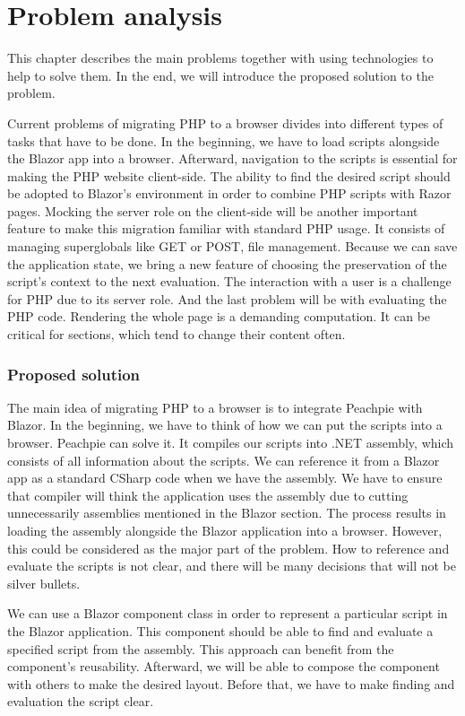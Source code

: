 \chapter{Problem analysis}

This chapter describes the main problems together with using technologies to help to solve them.
In the end, we will introduce the proposed solution to the problem.

Current problems of migrating PHP to a browser divides into different types of tasks that have to be done.
In the beginning, we have to load scripts alongside the Blazor app into a browser. 
Afterward, navigation to the scripts is essential for making the PHP website client-side.
The ability to find the desired script should be adopted to Blazor's environment in order to combine PHP scripts with Razor pages.
Mocking the server role on the client-side will be another important feature to make this migration familiar with standard PHP usage.
It consists of managing superglobals like GET or POST, file management.
Because we can save the application state, we bring a new feature of choosing the preservation of the script's context to the next evaluation.
The interaction with a user is a challenge for PHP due to its server role.
And the last problem will be with evaluating the PHP code.
Rendering the whole page is a demanding computation.
It can be critical for sections, which tend to change their content often.
 
\subsection{Proposed solution}
The main idea of migrating PHP to a browser is to integrate Peachpie with Blazor.
In the beginning, we have to think of how we can put the scripts into a browser.
Peachpie can solve it.
It compiles our scripts into .NET assembly, which consists of all information about the scripts.
We can reference it from a Blazor app as a standard CSharp code when we have the assembly.
We have to ensure that compiler will think the application uses the assembly due to cutting unnecessarily assemblies mentioned in the Blazor section.
The process results in loading the assembly alongside the Blazor application into a browser.
However, this could be considered as the major part of the problem.
How to reference and evaluate the scripts is not clear, and there will be many decisions that will not be silver bullets.

We can use a Blazor component class in order to represent a particular script in the Blazor application.
This component should be able to find and evaluate a specified script from the assembly.
This approach can benefit from the component's reusability.
Afterward, we will be able to compose the component with others to make the desired layout.
Before that, we have to make finding and evaluation the script clear.

